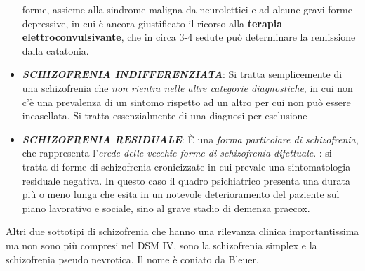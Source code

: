 \begin{itemize}
  forme, assieme alla sindrome maligna da neurolettici e ad alcune gravi
  forme depressive, in cui è ancora giustificato il ricorso alla
  \textbf{terapia elettroconvulsivante}, che in circa 3-4 sedute può
  determinare la remissione dalla catatonia.
\item
  \textbf{\emph{SCHIZOFRENIA INDIFFERENZIATA}}: Si tratta semplicemente
  di una schizofrenia che \emph{non rientra nelle altre categorie
  diagnostiche}, in cui non c'è una prevalenza di un sintomo rispetto ad
  un altro per cui non può essere incasellata. Si tratta essenzialmente
  di una diagnosi per esclusione
\item
  \textbf{\emph{SCHIZOFRENIA RESIDUALE}}: È una \emph{forma particolare
  di schizofrenia}, che rappresenta l'\emph{erede delle vecchie forme di
  schizofrenia difettuale}. : si tratta di forme di schizofrenia
  cronicizzate in cui prevale una sintomatologia residuale negativa. In
  questo caso il quadro psichiatrico presenta una durata più o meno
  lunga che esita in un notevole deterioramento del paziente sul piano
  lavorativo e sociale, sino al grave stadio di demenza praecox.
\end{itemize}

Altri due sottotipi di schizofrenia che hanno una rilevanza clinica
importantissima ma non sono più compresi nel DSM IV, sono la
schizofrenia simplex e la schizofrenia pseudo nevrotica. Il nome è
coniato da Bleuer.

